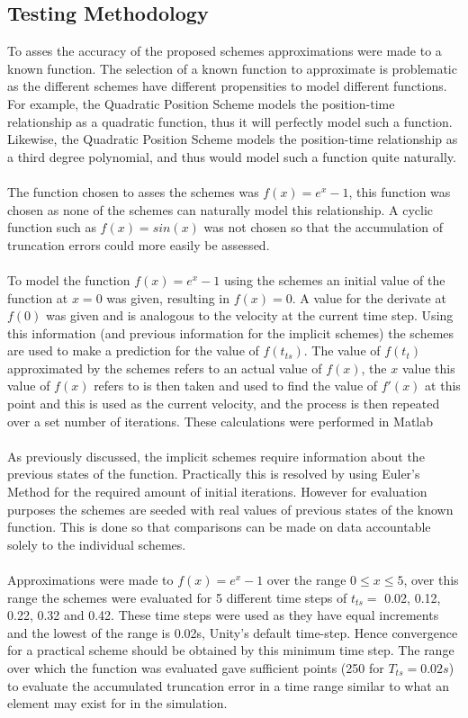 \subsection{Testing Methodology}
To asses the accuracy of the proposed schemes approximations were made to a known function. The selection of a known function to approximate is problematic as the different schemes have different propensities to model different functions. For example, the Quadratic Position Scheme models the position-time relationship as a quadratic function, thus it will perfectly model such a function. Likewise, the Quadratic Position Scheme models the position-time relationship as a third degree polynomial, and thus would model such a function quite naturally.
\\\\
The function chosen to asses the schemes was $f(x)=e^x-1$, this function was chosen as none of the schemes can naturally model this relationship. A cyclic function such as $f(x)=sin(x)$ was not chosen so that the accumulation of truncation errors could more easily be assessed. 
\\\\
To model the function $f(x)=e^x-1$ using the schemes an initial value of the function at $x=0$ was given, resulting in $f(x)=0$. A value for the derivate at $f(0)$ was given and is analogous to the velocity at the current time step. Using this information (and previous information for the implicit schemes) the schemes are used to make a prediction for the value of $f(t_{ts})$. The value of $f(t_{t})$ approximated by the schemes refers to an actual value of $f(x)$, the $x$ value this value of $f(x)$ refers to is then taken and used to find the value of $f'(x)$ at this point and this is used as the current velocity, and the process is then repeated over a set number of iterations. These calculations were performed in Matlab 
\\\\
As previously discussed, the implicit schemes require information about the previous states of the function. Practically this is resolved by using Euler's Method for the required amount of initial iterations. However for evaluation purposes the schemes are seeded with real values of previous states of the known function. This is done so that comparisons can be made on data accountable solely to the individual schemes.
\\\\
Approximations were made to $f(x)=e^x-1$ over the range $0\leqslant x \leqslant 5$, over this range the schemes were evaluated for 5 different time steps of $t_{ts}=$ 0.02, 0.12, 0.22, 0.32 and 0.42. These time steps were used as they have equal increments and the lowest of the range is 0.02s, Unity's default time-step. Hence convergence for a practical scheme should be obtained by this minimum time step. The range over which the function was evaluated gave sufficient points (250 for $T_{ts}=0.02s$) to evaluate the accumulated truncation error in a time range similar to what an element may exist for in the simulation.
